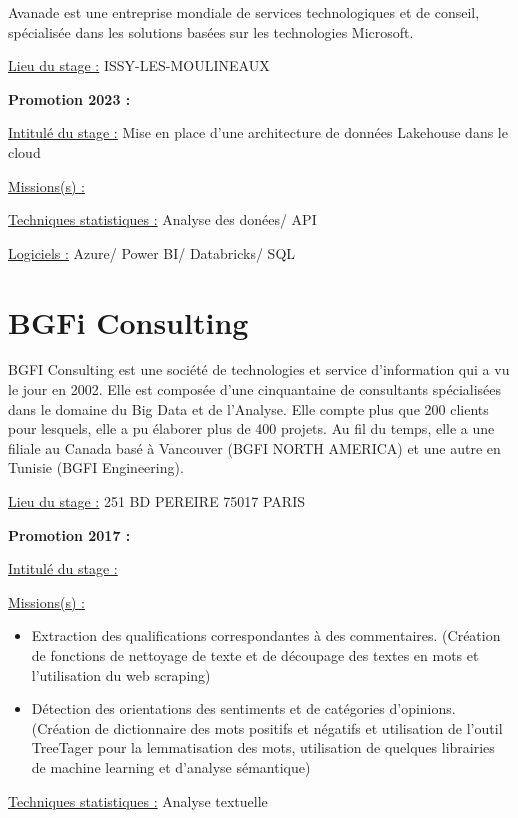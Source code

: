 \documentclass[
  letterpaper,
  DIV=11,
  numbers=noendperiod]{scrreprt}
\begin{document}
Avanade est une entreprise mondiale de services technologiques et de
conseil, spécialisée dans les solutions basées sur les technologies
Microsoft.

\uline{Lieu du stage :} ISSY-LES-MOULINEAUX

\textbf{Promotion 2023 :}

\uline{Intitulé du stage :} Mise en place d'une architecture de données
Lakehouse dans le cloud

\uline{Missions(s) :}

\uline{Techniques statistiques :} Analyse des donées/ API

\uline{Logiciels :} Azure/ Power BI/ Databricks/ SQL

\hypertarget{bgfi-consulting}{%
\section{\texorpdfstring{\textbf{BGFi
Consulting}}{BGFi Consulting}}\label{bgfi-consulting}}

BGFI Consulting est une société de technologies et service d'information
qui a vu le jour en 2002. Elle est composée d'une cinquantaine de
consultants spécialisées dans le domaine du Big Data et de l'Analyse.
Elle compte plus que 200 clients pour lesquels, elle a pu élaborer plus
de 400 projets. Au fil du temps, elle a une filiale au Canada basé à
Vancouver (BGFI NORTH AMERICA) et une autre en Tunisie (BGFI
Engineering).

\uline{Lieu du stage :} 251 BD PEREIRE 75017 PARIS

\textbf{Promotion 2017 :}

\uline{Intitulé du stage :}

\uline{Missions(s) :}

\begin{itemize}
\item
  Extraction des qualifications correspondantes à des commentaires.
  (Création de fonctions de nettoyage de texte et de découpage des
  textes en mots et l'utilisation du web scraping)
\item
  Détection des orientations des sentiments et de catégories d'opinions.
  (Création de dictionnaire des mots positifs et négatifs et utilisation
  de l'outil TreeTager pour la lemmatisation des mots, utilisation de
  quelques librairies de machine learning et d'analyse sémantique)
\end{itemize}

\uline{Techniques statistiques :} Analyse textuelle
\end{document}
